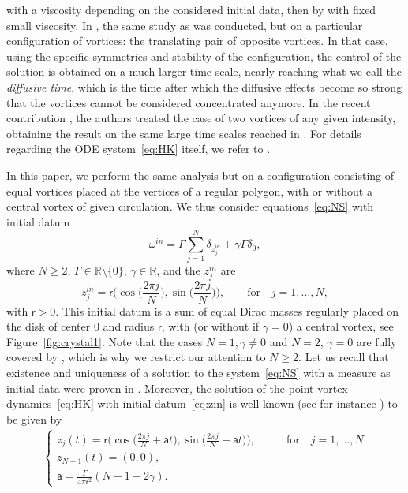 \documentclass[11pt,reqno,a4paper]{amsart}
\def\R {\mathbb{R}} %
\newcommand{\1}{\mathbbm{1}}
\theoremstyle{definition}
\theoremstyle{definition}
\numberwithin{equation}{section}
\begin{document}
 \cite{Mar98,CeSe18} with a viscosity depending on the considered initial data, then by \cite{CeSeis24} with fixed small viscosity. In \cite{dolce2024long}, the same study as \cite{Gallay2011} was conducted, but on a particular configuration of vortices: the translating pair of opposite vortices. In that case, using the specific symmetries and stability of the configuration, the control of the solution is obtained on a much larger time scale, nearly reaching what we call the \emph{diffusive time}, which is the time after which the diffusive effects become so strong that the vortices cannot be considered concentrated anymore. In the recent contribution \cite{zhang2025long}, the authors treated the case of two vortices of any given intensity, obtaining the result on the same large time scales reached in \cite{dolce2024long}. For details regarding the ODE system~\eqref{eq:HK} itself, we refer to \cite{Aref_2007}.

In this paper, we perform the same analysis but on a configuration consisting of equal vortices placed at the vertices of a regular polygon, with or without a central vortex of given circulation. 
We thus consider equations~\cref{eq:NS} with initial datum
\begin{equation}\label{eq:omegain}
    \omega^{in}=\Gamma\sum_{j=1}^N\delta_{z_j^{in}}+\gamma \Gamma \delta_{0},
\end{equation}
where $N\geq 2$, $\Gamma \in \R\setminus\{0\}$, $\gamma \in \R$, and the $z_j^{in}$ are
\begin{equation}\label{eq:zin}
    z_j^{in} = \mathsf{r}\Big(\cos\big(\frac{2\pi j}{N}\big) ,\sin\big(\frac{2\pi j}{N}\big) \Big), \qquad \text{for}\quad  j=1,\dots, N,
\end{equation}
with $\mathsf{r} >0$. This initial datum is a sum of equal Dirac masses regularly placed on the disk of center 0 and radius $\mathsf{r}$, with (or without if $\gamma=0$) a central vortex, see Figure~\ref{fig:crystal1}. Note that the cases $N=1,\gamma\neq0$ and $N=2$, $\gamma=0$ are fully covered by \cite{dolce2024long,zhang2025long}, which is why we restrict our attention to $N\geq2$. Let us recall that existence and uniqueness of a solution to the system~\cref{eq:NS} with a measure as initial data were proven in \cite{GaGa2005}. Moreover, the solution of the point-vortex dynamics~\cref{eq:HK} with initial datum~\cref{eq:zin} is well known (see for instance \cite{aref2002vortex}) to be given by
\begin{align}
\label{eq:zjt}
\begin{cases}z_j(t)=\mathsf{r}\big(\cos\big(\frac{2\pi j}{N}+\mathsf{a} t\big) ,\sin\big(\frac{2\pi j}{N}+\mathsf{a} t\big) \big), \qquad &\text{for}\quad  j=1,\dots, N\\
    z_{N+1}(t)=(0,0),\\
    \mathsf{a}=\frac{\Gamma}{4\pi \mathsf{r}^2}(N-1+2\gamma).
    \end{cases}
\end{align}
\end{document}
